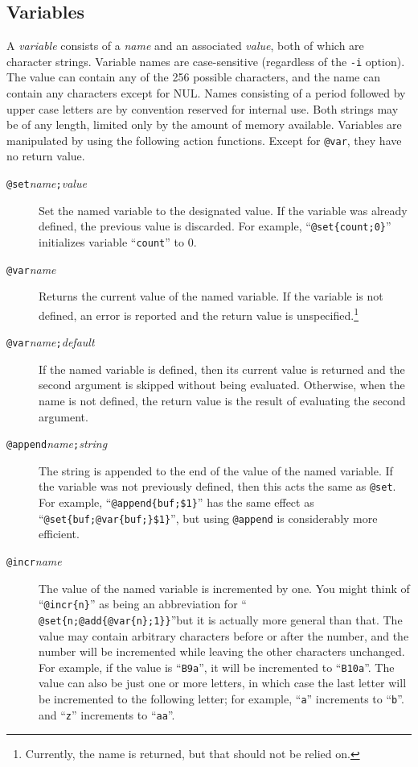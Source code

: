 \subsection{Variables}
A {\em variable} consists of a {\em name} and an associated {\em value},
both of which are character strings.  Variable names are case-sensitive
(regardless of the \verb|-i| option).
The value can contain any of the 256 possible characters, and the name
can contain any characters except for NUL.
Names consisting of a period followed by upper case letters are
by convention reserved for internal use.
Both strings may be of any length, limited only by the amount of memory
available.
Variables are manipulated by using the following action functions.
Except for \verb|@var|, they have no return value.
\begin{description}
\item[{\tt @set\ttlb}{\it name}{\tt ;}{\it value}{\tt \ttrb}]
Set the named variable to the designated value.
If the variable was already defined, the previous value is discarded.
For example, ``\verb|@set{count;0}|'' initializes variable ``\verb|count|'' to 0.
\item[{\tt @var\ttlb}{\it name}{\tt \ttrb}]
Returns the current value of the named variable.  If the variable is not
defined, an error is reported and the return value is
unspecified.\footnote{Currently, the name is returned, but that should
not be relied on.}
\item[{\tt @var\ttlb}{\it name}{\tt ;}{\it default}{\tt \ttrb}]
If the named variable is defined, then its current value is returned and
the second argument is skipped without being evaluated.
Otherwise, when the name is not defined, the return value is the result
of evaluating the second argument.

\item[{\tt @append\ttlb}{\it name}{\tt ;}{\it string}{\tt \ttrb}]
The string is appended to the end of the value of the named variable.
If the variable was not previously defined, then this acts the same as
\verb|@set|.
For example, ``\verb|@append{buf;$1}|'' has the same effect as
``\verb|@set{buf;@var{buf;}$1}|'', but using \verb|@append| is
considerably more efficient.

\item[{\tt @incr\ttlb}{\it name}{\tt \ttrb}]
The value of the named variable is incremented by one.
You might think of ``\verb|@incr{n}|'' as being an abbreviation for\newline
``\verb|  @set{n;@add{@var{n};1}}|''\newline but it is actually more general
than that.  The value may contain arbitrary characters before or after
the number, and the number will be incremented while leaving the other
characters unchanged.  For example, if the value is ``\verb|B9a|'', it
will be incremented to ``\verb|B10a|''.  The value can also be just one
or more letters, in which case the last letter will be incremented to
the following letter; for example, ``\verb|a|'' increments to ``\verb|b|''.
and ``\verb|z|'' increments to ``\verb|aa|''.


\end{description}
